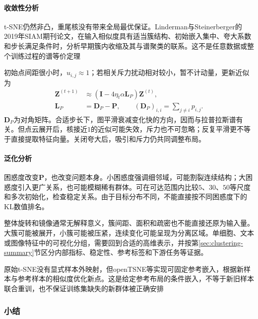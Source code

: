 \paragraph{收敛性分析}

t-SNE仍然非凸，重尾核没有带来全局最优保证。Linderman与Steinerberger的2019年SIAM期刊论文，在输入相似度具有适当簇结构、初始嵌入集中、夸大系数和步长满足条件时，分析早期簇内收缩及其与谱聚类的联系。这不是任意数据或整个训练过程的谱等价定理

初始点间距很小时，$u_{i,j}\approx1$；若相关斥力扰动相对较小，暂不计动量，更新近似为
\begin{equation}
  \label{eq:dim-tsne-spectral-approximation}
  \begin{aligned}
    \bm{Z}^{(t+1)}
      &\approx(\bm{I}-4\eta_t\alpha\bm{L}_{P})\bm{Z}^{(t)},\\
    \bm{L}_{P}&=\bm{D}_{P}-\bm{P},\qquad
    (\bm{D}_{P})_{i,i}=\sum_{j\ne i}p_{i,j}.
  \end{aligned}
\end{equation}
$\bm{D}_{P}$为对角矩阵。合适步长下，图平滑衰减变化快的方向，因而与拉普拉斯谱有关。但点云展开后，核接近$1$的近似可能失效，斥力也不可忽略；反复平滑更不等于直接提取特征向量。关闭夸大后，吸引和斥力仍共同调整布局。

\paragraph{泛化分析}

困惑度改变$\bm{P}$，也改变问题本身。小困惑度强调细邻域，可能割裂连续结构；大困惑度引入更广关系，也可能模糊稀有群体。可在可达范围内比较$5$、$30$、$50$等尺度和多次初始化，检查稳定关系。由于目标分布不同，不能直接按不同困惑度下的KL数值排名。

整体旋转和镜像通常无解释意义，簇间距、面积和疏密也不能直接还原为输入量。大簇可能被展开，小簇可能被压紧，连续变化可能呈现为分离区域。单细胞、文本或图像特征中的可视化分组，需要回到合适的高维表示，并按第\ref{sec:clustering-summary}节区分内部指标、稳定性、参考标签和下游任务等证据。

原始t-SNE没有显式样本外映射，但openTSNE等实现可固定参考嵌入，根据新样本与参考样本的相似度优化新点。这是给定参考布局的条件嵌入，不等于新旧样本联合重训，也不保证训练集缺失的新群体被正确安排

\subsubsection{小结}

